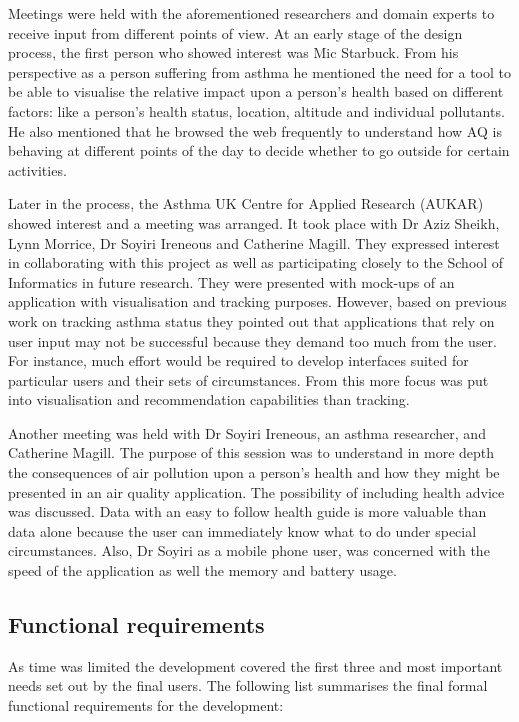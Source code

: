 Meetings were held with the aforementioned researchers and domain experts to receive input from different points of view. At an early stage of the design process, the first person who showed interest was Mic Starbuck. From his perspective as a person suffering from asthma he mentioned the need for a tool to be able to visualise the relative impact upon a person's health based on different factors: like a person's health status, location, altitude and individual pollutants. He also mentioned that he browsed the web frequently to understand how AQ is behaving at different points of the day to decide whether to go outside for certain activities. 

Later in the process, the Asthma UK Centre for Applied Research (AUKAR) showed interest and a meeting was arranged. It took place with Dr Aziz Sheikh, Lynn Morrice, Dr Soyiri Ireneous and Catherine Magill. They expressed interest in collaborating with this project as well as participating closely to the School of Informatics in future research. They were presented with mock-ups of an application with visualisation and tracking purposes. However, based on previous work on tracking asthma status they pointed out that applications that rely on user input may not be successful because they demand too much from the user. For instance, much effort would be required to develop interfaces suited for particular users and their sets of circumstances. From this more focus was put into visualisation and recommendation capabilities than tracking.

Another meeting was held with Dr Soyiri Ireneous, an asthma researcher, and Catherine Magill. The purpose of this session was to understand in more depth the consequences of air pollution upon a person's health and how they might be presented in an air quality application. The possibility of including health advice was discussed. Data  with an easy to follow health guide is more valuable than data alone because the user can immediately know what to do under special circumstances. Also, Dr Soyiri as a mobile phone user, was concerned with the speed of the application as well the memory and battery usage.

\subsection{Functional requirements}

As time was limited the development covered the first three and most important needs set out by the final users. The following list summarises the final formal functional requirements for the development:

